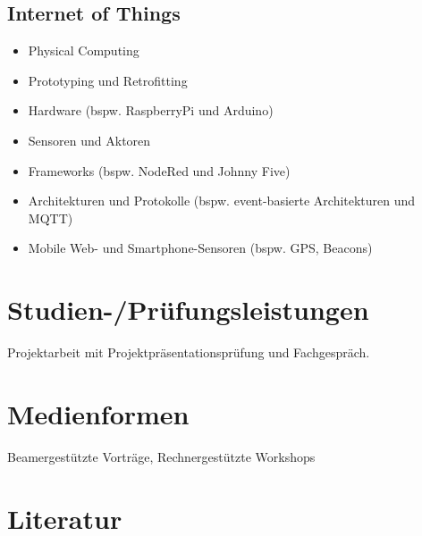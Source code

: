 \subsection*{Internet of
Things\label{/mi-2017/modulbeschreibungen-bachelor/BA_Vertiefung-Web_Development}}\label{internet-of-thingspathlabelmi-2017modulbeschreibungen-bachelorbaux5fvertiefung-webux5fdevelopment-2}

\begin{itemize}
\tightlist
\item
  Physical Computing
\item
  Prototyping und Retrofitting
\item
  Hardware (bspw. RaspberryPi und Arduino)
\item
  Sensoren und Aktoren
\item
  Frameworks (bspw. NodeRed und Johnny Five)
\item
  Architekturen und Protokolle (bspw. event-basierte Architekturen und
  MQTT)
\item
  Mobile Web- und Smartphone-Sensoren (bspw. GPS, Beacons)
\end{itemize}

\section*{Studien-/Prüfungsleistungen\label{/mi-2017/modulbeschreibungen-bachelor/BA_Vertiefung-Web_Development}}\label{studien-pruxfcfungsleistungenpathlabelmi-2017modulbeschreibungen-bachelorbaux5fvertiefung-webux5fdevelopment}

Projektarbeit mit Projektpräsentationsprüfung und Fachgespräch.

\section*{Medienformen\label{/mi-2017/modulbeschreibungen-bachelor/BA_Vertiefung-Web_Development}}\label{medienformenpathlabelmi-2017modulbeschreibungen-bachelorbaux5fvertiefung-webux5fdevelopment}

Beamergestützte Vorträge, Rechnergestützte Workshops

\section*{Literatur\label{/mi-2017/modulbeschreibungen-bachelor/BA_Vertiefung-Web_Development}}\label{literaturpathlabelmi-2017modulbeschreibungen-bachelorbaux5fvertiefung-webux5fdevelopment}

